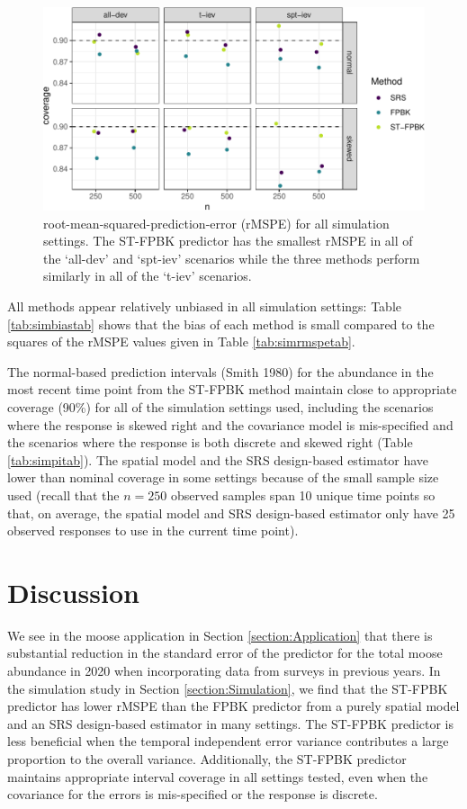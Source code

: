 \documentclass[smallextended]{svjour3}       %
\begin{document}
\begin{figure}
\centering
\includegraphics{preprint_springer_files/figure-latex/unnamed-chunk-19-1.pdf}
\caption{\label{fig:rmspe} root-mean-squared-prediction-error (rMSPE)
for all simulation settings. The ST-FPBK predictor has the smallest
rMSPE in all of the `all-dev' and `spt-iev' scenarios while the three
methods perform similarly in all of the `t-iev' scenarios.}
\end{figure}

All methods appear relatively unbiased in all simulation settings: Table
\ref{tab:simbiastab} shows that the bias of each method is small
compared to the squares of the rMSPE values given in Table
\ref{tab:simrmspetab}.

The normal-based prediction intervals (Smith 1980) for the abundance in
the most recent time point from the ST-FPBK method maintain close to
appropriate coverage (90\%) for all of the simulation settings used,
including the scenarios where the response is skewed right and the
covariance model is mis-specified and the scenarios where the response
is both discrete and skewed right (Table \ref{tab:simpitab}). The
spatial model and the SRS design-based estimator have lower than nominal
coverage in some settings because of the small sample size used (recall
that the \(n = 250\) observed samples span 10 unique time points so
that, on average, the spatial model and SRS design-based estimator only
have 25 observed responses to use in the current time point).

\hypertarget{section:Discussion}{%
\section{Discussion}\label{section:Discussion}}

We see in the moose application in Section \ref{section:Application}
that there is substantial reduction in the standard error of the
predictor for the total moose abundance in 2020 when incorporating data
from surveys in previous years. In the simulation study in Section
\ref{section:Simulation}, we find that the ST-FPBK predictor has lower
rMSPE than the FPBK predictor from a purely spatial model and an SRS
design-based estimator in many settings. The ST-FPBK predictor is less
beneficial when the temporal independent error variance contributes a
large proportion to the overall variance. Additionally, the ST-FPBK
predictor maintains appropriate interval coverage in all settings
tested, even when the covariance for the errors is mis-specified or the
response is discrete.
\end{document}
